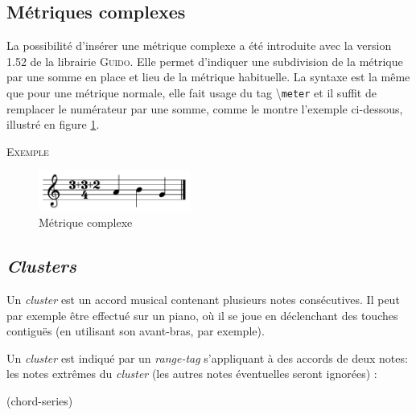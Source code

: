\documentclass{article}
\newenvironment{gmncode}	{\vspace{-2mm}\small\verbatim}{\endverbatim\vspace{-2mm}}
\newcommand{\guido}			{\textsc{Guido}}
\newcommand{\code}[1]		{{\small \texttt{#1}}}
\newcommand{\guidotag}[1]	{\textbackslash\code{#1}}
\newcommand{\exemple}		{\vspace{2mm}\hspace*{-6mm}\textsc{Exemple}}
\begin{document}
\subsection{Métriques complexes}\label{subsec:metriques}

La possibilité d'insérer une métrique complexe a été introduite avec la version 1.52 de la librairie \guido. Elle permet d'indiquer une subdivision de la métrique par une somme en place et lieu de la métrique habituelle. La syntaxe est la même que pour une métrique normale, elle fait usage du tag \guidotag{meter} et il suffit de remplacer le numérateur par une somme, comme le montre l'exemple ci-dessous, illustré en figure \ref{fig:complexMeter}.

\exemple\\
\begin{gmncode}
  [ \meter<"3+3+2/4"> a b g ]
\end{gmncode}

\begin{figure}[h]
\centering
\includegraphics[width=50mm]{img/partitions/complexMeter.pdf}
\caption{Métrique complexe}
\label{fig:complexMeter}
\end{figure}

\subsection{\emph{Clusters}}\label{subsec:clusters}

Un \emph{cluster} est un accord musical contenant plusieurs notes consécutives. Il peut par exemple être effectué sur un piano, où il se joue en déclenchant des touches contiguës (en utilisant son avant-bras, par exemple).

Un \emph{cluster} est indiqué par un \emph{range-tag} s'appliquant à des accords de deux notes: les notes extrêmes du \emph{cluster} (les autres notes éventuelles seront ignorées) :

\begin{gmncode}
(chord-series)
\end{gmncode}
\end{document}
